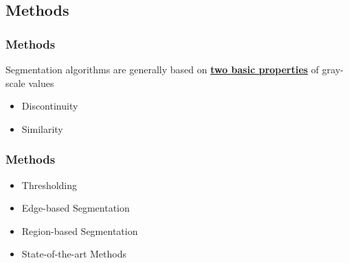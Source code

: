 \documentclass[notheorems,mathserif,table,compress]{beamer}  %
\begin{document}

\subsection{Methods}


\begin{frame}
    \frametitle{Methods}
    Segmentation algorithms are generally based on \underline{\textbf{two basic properties}} of gray-scale values
    \begin{itemize}
    \item Discontinuity
    \item Similarity \newline
    \end{itemize}
    {}
\end{frame}


\begin{frame}
    \frametitle{Methods}
    \begin{itemize}
    \item Thresholding
    \item Edge-based Segmentation
    \item Region-based Segmentation
    \item State-of-the-art Methods
    \end{itemize}
\end{frame}
\end{document}
